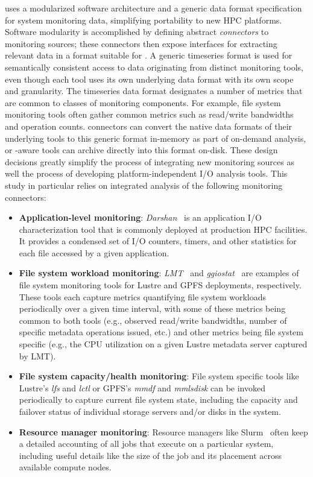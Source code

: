 \tokio uses a modularized software architecture and a generic data format
specification for system monitoring data, simplifying portability to new HPC
platforms. Software modularity is accomplished by defining abstract
\textit{connectors} to monitoring sources; these connectors then expose interfaces for
extracting relevant data in a format suitable for \tokio.  A generic
timeseries format is used for semantically consistent access to data
originating from distinct monitoring tools, even though each tool uses its
own underlying data format with its own scope and granularity.
The timeseries data format designates a number of metrics
that are common to classes of monitoring components.  For example, file system
monitoring tools often gather common metrics such as read/write bandwidths
and operation counts. \tokio connectors can convert the native data formats
of their underlying tools to this generic format in-memory as part of
on-demand analysis, or \tokio-aware tools can archive directly into this
format on-disk. These design decisions greatly simplify the process of
integrating new monitoring sources as well the process of developing
platform-independent I/O analysis tools.  This study in particular relies on
integrated analysis of the following monitoring connectors:

\begin{itemize}[leftmargin=*]
\item \textbf{Application-level monitoring}: \textit{Darshan}~\cite{Carns2009} is an application I/O characterization tool that is commonly deployed at production HPC facilities. It provides a condensed set of I/O counters, timers, and other statistics for each file accessed by a given application.

\item \textbf{File system workload monitoring}: \textit{LMT}~\cite{lmt} and \textit{ggiostat}~\cite{Lockwood2017} are examples of 
file system monitoring tools for Lustre and GPFS deployments, respectively. These tools each capture metrics quantifying file system workloads periodically over a given time interval, with some of these metrics being common to both tools (e.g., observed read/write bandwidths, number of specific metadata operations issued, etc.) and other metrics being file system specific (e.g., the CPU utilization on a given Lustre metadata server captured by LMT).

\item \textbf{File system capacity/health monitoring}: File system specific tools like Lustre's \textit{lfs} and \textit{lctl} or GPFS's \textit{mmdf} and \textit{mmlsdisk} can be invoked periodically to capture current file system state, including the capacity and failover status of individual storage servers and/or disks in the system.

\item \textbf{Resource manager monitoring}: Resource managers like Slurm~\cite{2003slurm} often keep a detailed accounting of all jobs that execute on a particular system, including useful details like the size of the job and its placement across available compute nodes.
\end{itemize}

